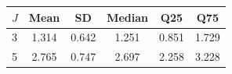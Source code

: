 \begin{tabular}{lccccc}
\toprule
$J$ & Mean & SD & Median & Q25 & Q75 \\
\midrule
3 & 1.314 & 0.642 & 1.251 & 0.851 & 1.729 \\
5 & 2.765 & 0.747 & 2.697 & 2.258 & 3.228 \\
\bottomrule
\end{tabular}
